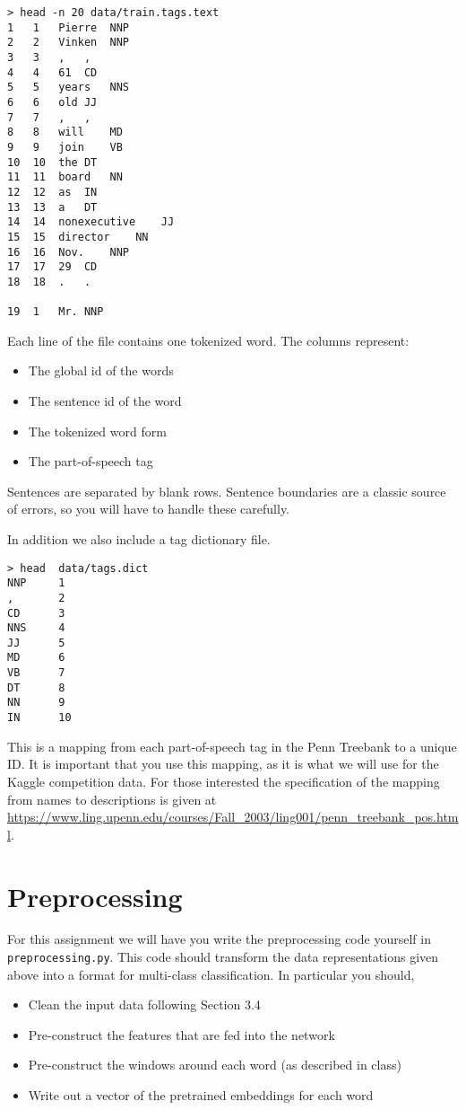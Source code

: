 \documentclass[11pt]{article}
\begin{document}
\begin{verbatim}
> head -n 20 data/train.tags.text
1	1	Pierre	NNP
2	2	Vinken	NNP
3	3	,	,
4	4	61	CD
5	5	years	NNS
6	6	old	JJ
7	7	,	,
8	8	will	MD
9	9	join	VB
10	10	the	DT
11	11	board	NN
12	12	as	IN
13	13	a	DT
14	14	nonexecutive	JJ
15	15	director	NN
16	16	Nov.	NNP
17	17	29	CD
18	18	.	.

19	1	Mr.	NNP
\end{verbatim}

\vspace{0.5cm}

Each line of the file contains one tokenized word. The columns represent:

\begin{itemize}
\item The global id of the words
\item The sentence id of the word
\item The tokenized word form
\item The part-of-speech tag 
\end{itemize}

Sentences are separated by blank rows. Sentence boundaries are a classic source 
of errors, so you will have to handle these carefully. 


In addition we also include a tag dictionary file. 

\begin{verbatim}
> head  data/tags.dict 
NNP     1
,       2
CD      3
NNS     4
JJ      5
MD      6
VB      7
DT      8
NN      9
IN      10
\end{verbatim}

This is a mapping from each
part-of-speech tag in the Penn
Treebank to a unique ID. It is
important that you use this mapping,
as it is what we will use for the
Kaggle competition data. For those
interested the specification of the
mapping from names to descriptions
is given at
\url{https://www.ling.upenn.edu/courses/Fall_2003/ling001/penn_treebank_pos.html}.


\section{Preprocessing}

For this assignment we will have you write the preprocessing code 
yourself in \texttt{preprocessing.py}. This code should transform
the data representations given above into a format for multi-class 
classification. In particular you should,

\begin{itemize}
\item Clean the input data following Section 3.4
\item Pre-construct the features that are fed into the network
\item Pre-construct the windows around each word (as described in class)
\item Write out a vector of the pretrained embeddings for each word
\end{itemize}
\end{document}

